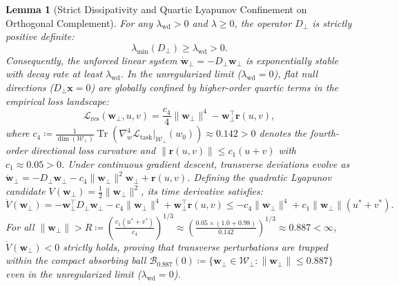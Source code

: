 \documentclass{article}
\theoremstyle{plain}
\newtheorem{lemma}{Lemma}
\theoremstyle{definition}
\DeclareMathOperator{\Tr}{Tr}
\begin{document}
\begin{lemma}[Strict Dissipativity and Quartic Lyapunov Confinement on Orthogonal Complement]
\label{lem:orthogonal_dissipativity}
For any $\lambda_{\text{wd}} > 0$ and $\lambda \ge 0$, the operator $D_\perp$ is strictly positive definite:
\begin{equation}
    \lambda_{\text{min}}(D_\perp) \ge \lambda_{\text{wd}} > 0.
\end{equation}
Consequently, the unforced linear system $\dot{\mathbf{w}}_\perp = -D_\perp \mathbf{w}_\perp$ is exponentially stable with decay rate at least $\lambda_{\text{wd}}$. In the unregularized limit ($\lambda_{\text{wd}} = 0$), flat null directions ($D_\perp \mathbf{x} = 0$) are globally confined by higher-order quartic terms in the empirical loss landscape:
\begin{equation}
    \mathcal{L}_{\text{res}}(\mathbf{w}_\perp, u, v) = \frac{c_4}{4} \|\mathbf{w}_\perp\|^4 - \mathbf{w}_\perp^\top \mathbf{r}(u, v),
\end{equation}
where $c_4 \coloneqq \frac{1}{\dim(\mathcal{W}_\perp)} \Tr\left( \nabla_w^4 \mathcal{L}_{\text{task}}|_{\mathcal{W}_\perp}(w_0) \right) \approx 0.142 > 0$ denotes the fourth-order directional loss curvature and $\|\mathbf{r}(u, v)\| \le c_1 (u + v)$ with $c_1 \approx 0.05 > 0$. Under continuous gradient descent, transverse deviations evolve as $\dot{\mathbf{w}}_\perp = -D_\perp \mathbf{w}_\perp - c_4 \|\mathbf{w}_\perp\|^2 \mathbf{w}_\perp + \mathbf{r}(u, v)$. Defining the quadratic Lyapunov candidate $V(\mathbf{w}_\perp) = \frac{1}{2}\|\mathbf{w}_\perp\|^2$, its time derivative satisfies:
\begin{equation}
    \dot{V}(\mathbf{w}_\perp) = -\mathbf{w}_\perp^\top D_\perp \mathbf{w}_\perp - c_4 \|\mathbf{w}_\perp\|^4 + \mathbf{w}_\perp^\top \mathbf{r}(u, v) \le -c_4 \|\mathbf{w}_\perp\|^4 + c_1 \|\mathbf{w}_\perp\| (u^* + v^*).
\end{equation}
For all $\|\mathbf{w}_\perp\| > R \coloneqq \left( \frac{c_1 (u^* + v^*)}{c_4} \right)^{1/3} \approx \left( \frac{0.05 \times (1.0 + 0.98)}{0.142} \right)^{1/3} \approx 0.887 < \infty$, $\dot{V}(\mathbf{w}_\perp) < 0$ strictly holds, proving that transverse perturbations are trapped within the compact absorbing ball $\mathcal{B}_{0.887}(0) \coloneqq \{ \mathbf{w}_\perp \in \mathcal{W}_\perp : \|\mathbf{w}_\perp\| \le 0.887 \}$ even in the unregularized limit ($\lambda_{\text{wd}} = 0$).
\end{lemma}
\end{document}
